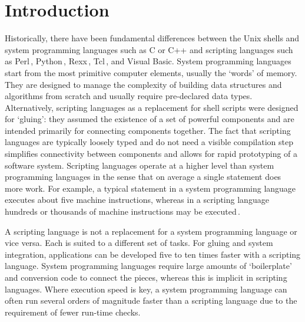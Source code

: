 \documentclass[12pt]{article}
\begin{document}

\section{Introduction}

Historically, there have been fundamental differences between the Unix
shells and system programming languages such as C or C++ and
scripting languages such as
Perl\,\cite{wall99:_perl_progr_refer_guide},
Python\,\cite{martelli06:_python_nutsh},
Rexx\,\cite{o'hara88:_moder_progr_using_rexx},
Tcl\,\cite{ousterhout94:_tcl_tk_toolk}, and Visual Basic.  System
programming languages start from the most primitive computer elements, usually the `words' of memory. They are designed to manage the complexity of
building data structures and algorithms from scratch and usually
require pre-declared data types.  Alternatively, scripting languages
as a replacement for shell scripts were designed for `gluing': they
assumed the existence of a set of powerful components and are
intended primarily for connecting components together. The fact that
scripting languages are typically loosely typed and do not need a
visible compilation step simplifies connectivity between components
and allows for rapid prototyping of a software system.
Scripting languages operate at a higher level than system programming
languages in the sense that on average a single statement does more
work. For example, a typical statement in a system programming
language executes about five machine instructions, whereas in a
scripting language hundreds or thousands of machine instructions may
be executed\,\cite{ousterhout98:_scrip}.


A scripting language is not a replacement for a system programming
language or vice versa. Each is suited to a different set of tasks.
For gluing and system integration, applications can be developed
five to ten times faster with a scripting language. System programming languages
require large amounts of `boilerplate' and conversion code to connect
the pieces, whereas this is implicit in scripting languages. Where
execution speed is key, a system programming language can often run
several orders of magnitude faster than a scripting language due to the requirement of
fewer run-time checks.
\end{document}
